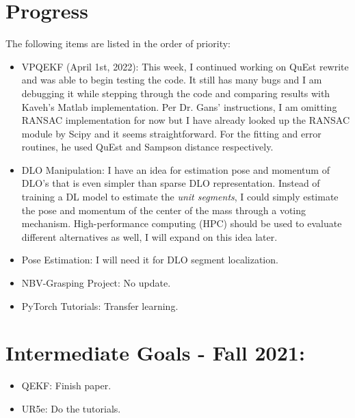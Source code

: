 \documentclass[11pt]{article}
\begin{document}
\section{Progress}
The following items are listed in the order of priority:
\begin{itemize}
      \item VPQEKF (April 1st, 2022): This week, I continued working on QuEst
      rewrite and was able to begin testing the code. It still has many bugs and
      I am debugging it while stepping through the code and comparing results
      with Kaveh's Matlab implementation. Per Dr. Gans' instructions, I am
      omitting RANSAC implementation for now but I have already looked up the
      RANSAC module by Scipy and it seems straightforward. For the fitting and
      error routines, he used QuEst and Sampson distance respectively.
      \item DLO Manipulation: I have an idea for estimation pose and momentum
      of DLO's that is even simpler than sparse DLO representation. Instead of
      training a DL model to estimate the \emph{unit segments}, I could simply
      estimate the pose and momentum of the center of the mass through
      a voting mechanism. High-performance computing (HPC) should be used to
      evaluate different alternatives as well, I will expand on this idea later.
      \item Pose Estimation: I will need it for DLO segment localization.
      \item NBV-Grasping Project: No update.
      \item PyTorch Tutorials: Transfer learning.
\end{itemize}

\section{Intermediate Goals - Fall 2021:}
\begin{itemize}
      \item QEKF: Finish paper.
      \item UR5e: Do the tutorials.
\end{itemize}

\newpage

\newpage


\end{document}
